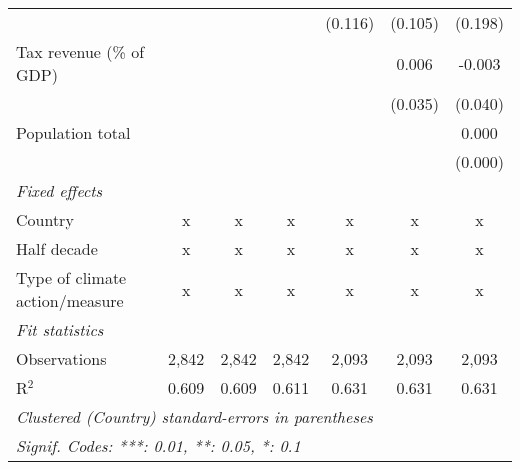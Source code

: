 \begin{tabular}{lcccccc}
                                                               &         &         &                & (0.116)        & (0.105)        & (0.198)\\   
   Tax revenue (\% of GDP)                                     &         &         &                &                & 0.006          & -0.003\\   
                                                               &         &         &                &                & (0.035)        & (0.040)\\   
   Population total                                            &         &         &                &                &                & 0.000\\   
                                                               &         &         &                &                &                & (0.000)\\   
   \emph{Fixed effects}\\
   Country                                                     & x       & x       & x              & x              & x              & x\\  
   Half decade                                                 & x       & x       & x              & x              & x              & x\\  
   Type of climate action/measure                              & x       & x       & x              & x              & x              & x\\  
   \midrule \emph{Fit statistics}\\
   Observations                                                & 2,842   & 2,842   & 2,842          & 2,093          & 2,093          & 2,093\\  
   R$^2$                                                       & 0.609   & 0.609   & 0.611          & 0.631          & 0.631          & 0.631\\  
   \midrule
   \multicolumn{7}{l}{\emph{Clustered (Country) standard-errors in parentheses}}\\
   \multicolumn{7}{l}{\emph{Signif. Codes: ***: 0.01, **: 0.05, *: 0.1}}\\
\end{tabular}
\par\endgroup


